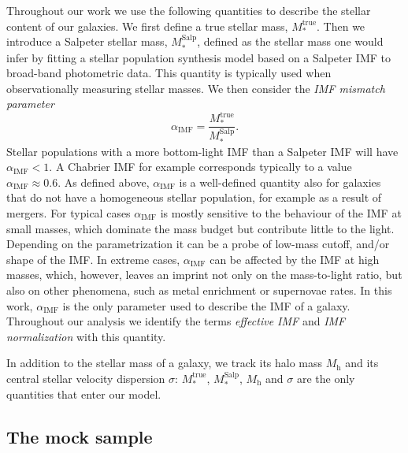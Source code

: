 \documentclass[usenatbib]{mnras}
\def\mhalo{M_{\mathrm{h}}}
\def\mtrue{M_*^{\mathrm{true}}}
\def\msalp{M_*^{\mathrm{Salp}}}
\def\aimf{\alpha_{\mathrm{IMF}}}
\begin{document}
Throughout our work we use the following quantities to describe the
stellar content of our galaxies. We first define a true stellar mass,
$\mtrue$. Then we introduce a Salpeter \citep{Sal55} stellar
mass, $\msalp$, defined as the stellar mass one would infer by fitting
a stellar population synthesis model based on a Salpeter IMF to
broad-band photometric data. This quantity is typically used when
observationally measuring stellar masses.  We then consider the {\em
  IMF mismatch parameter} \citep{Tre++10}
\begin{equation}\label{eq:aimf}
\aimf = \frac{\mtrue}{\msalp}.
\end{equation}
Stellar populations with a more bottom-light IMF than a Salpeter IMF
will have $\aimf<1$. A Chabrier IMF for example corresponds typically
to a value $\aimf\approx0.6$.  As defined above, $\aimf$ is a
well-defined quantity also for galaxies that do not have a homogeneous
stellar population, for example as a result of mergers.  For typical
cases $\aimf$ is mostly sensitive to the behaviour of the IMF at small
masses, which dominate the mass budget but contribute little to
  the light. Depending on the parametrization it can be a probe of
low-mass cutoff, and/or shape of the IMF. In
  extreme cases, $\aimf$ can be affected by the IMF at high masses,
  which, however, leaves an imprint not only on the mass-to-light
  ratio, but also on other phenomena, such as metal enrichment or
  supernovae rates. In this work, $\aimf$ is the only parameter used
to describe the IMF of a galaxy. Throughout our analysis we identify
the terms {\em effective IMF} and {\em IMF normalization} with this quantity.

In addition to the stellar mass of a galaxy, we track its halo
  mass $\mhalo$ and its central stellar velocity dispersion $\sigma$:
  $\mtrue$, $\msalp$, $\mhalo$ and $\sigma$ are the only quantities
  that enter our model.

\subsection{The mock sample}
\end{document}
